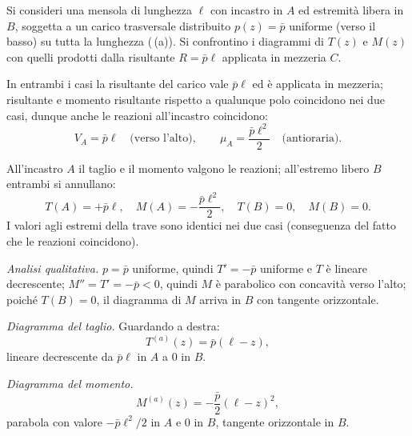 \begin{esempio}
	Si consideri una mensola di lunghezza $\ell$
	con incastro in $A$ ed estremità libera in $B$,
	soggetta a un carico trasversale distribuito
	$p(z) = \bar{p}$ uniforme (verso il basso) su
	tutta la lunghezza (\,(a)).
	Si confrontino i diagrammi di $T(z)$ e $M(z)$
	con quelli prodotti dalla risultante $R =
	\bar{p}\ell$ applicata in mezzeria $C$.
	
	\begin{svolgimento}
		
		
		In entrambi i casi la risultante del carico vale
		$\bar p\ell$ ed è applicata in mezzeria; risultante
		e momento risultante rispetto a qualunque polo
		coincidono nei due casi, dunque anche le reazioni
		all'incastro coincidono:
		\[
		V_A = \bar p\ell \quad\text{(verso l'alto)}, \qquad
		\mu_A = \frac{\bar p\ell^2}{2}
		\quad\text{(antioraria)}.
		\]
		
		All'incastro $A$ il taglio e il momento valgono
		le reazioni; all'estremo libero $B$ entrambi si
		annullano:
		\[
		T(A) = +\bar p\ell, \quad
		M(A) = -\frac{\bar p\ell^2}{2}, \quad
		T(B) = 0, \quad M(B) = 0.
		\]
		I valori agli estremi della trave sono identici
		nei due casi (conseguenza del fatto che le
		reazioni coincidono).



		
		
		
		\textit{Analisi qualitativa.} $p = \bar p$
		uniforme, quindi $T' = -\bar p$ uniforme e $T$
		è lineare decrescente; $M'' = T' = -\bar p < 0$,
		quindi $M$ è parabolico con concavità verso
		l'alto; poiché $T(B) = 0$, il diagramma di $M$
		arriva in $B$ con tangente orizzontale.
		
		\textit{Diagramma del taglio.} Guardando a destra:
		\[
		T^{(a)}(z) = \bar p(\ell - z),
		\]
		lineare decrescente da $\bar p\ell$ in $A$ a $0$
		in $B$.
		
		\textit{Diagramma del momento.}
		\[
		M^{(a)}(z) = -\frac{\bar p}{2}(\ell-z)^2,
		\]
		parabola con valore $-\bar p\ell^2/2$ in $A$ e
		$0$ in $B$, tangente orizzontale in $B$.
		
		

\end{svolgimento}
\end{esempio}
